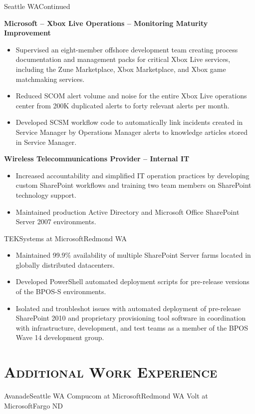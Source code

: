 \documentclass[11pt,letter,roman]{moderncv} %
\begin{document}
{Seattle WA}{Continued}{%
  \textbf{Microsoft -- Xbox Live Operations -- Monitoring Maturity Improvement}
  \begin{itemize}
    \item Supervised an eight-member offshore development team creating
      process documentation and management packs for critical Xbox Live
      services, including the Zune Marketplace, Xbox Marketplace, and Xbox
      game matchmaking services.
    \item Reduced SCOM alert volume and noise for the entire Xbox Live
      operations center from 200K duplicated alerts to forty relevant alerts
      per month.
    \item Developed SCSM workflow code to automatically link incidents created
      in Service Manager by Operations Manager alerts to knowledge articles
      stored in Service Manager.
  \end{itemize}
  \textbf{Wireless Telecommunications Provider -- Internal IT}
  \begin{itemize}
    \item Increased accountability and simplified IT operation practices by
      developing custom SharePoint workflows and training two team members
      on SharePoint technology support.
    \item Maintained production Active Directory and Microsoft Office
      SharePoint Server 2007 environments.
  \end{itemize}
}
{TEKSystems at Microsoft}{Redmond WA}{}{%
  \begin{itemize}
    \item Maintained 99.9\% availability of multiple SharePoint Server farms
      located in globally distributed datacenters.
    \item Developed PowerShell automated deployment scripts for pre-release
      versions of the BPOS-S environments.
    \item Isolated and troubleshot issues with automated deployment of
      pre-release SharePoint 2010 and proprietary provisioning tool software
      in coordination with infrastructure, development, and test teams as a
      member of the BPOS Wave 14 development group. 
  \end{itemize}
}

\section{\textsc{Additional Work Experience}}
{Avanade}{Seattle WA}{}{}
{Compucom at Microsoft}{Redmond WA}{}{}
{Volt at Microsoft}{Fargo ND}{}{}
\end{document}
